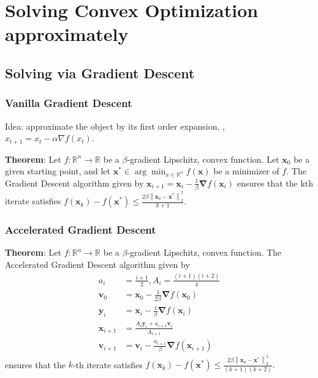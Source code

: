 \section{Solving Convex Optimization approximately}

\subsection{Solving via Gradient Descent}

\subsubsection{Vanilla Gradient Descent}

Idea: approximate the object by its first order expansion, \ie, $x_{t+1} = x_t - \alpha \nabla f(x_t)$.

\textbf{Theorem}: Let $f: \mathbb{R}^{n} \rightarrow \mathbb{R}$ be a $\beta$-gradient Lipschitz, convex function. Let $\boldsymbol{x}_{0}$ be a given starting point, and let $\boldsymbol{x}^{*} \in \arg \min _{x \in \mathbb{R}^{n}} f(\boldsymbol{x})$ be a minimizer of $f$. The Gradient Descent algorithm given by
$
\boldsymbol{x}_{i+1}=\boldsymbol{x}_{i}-\frac{1}{\beta} \boldsymbol{\nabla} f\left(\boldsymbol{x}_{i}\right)
$
ensures that the kth iterate satisfies
$
f\left(\boldsymbol{x}_{k}\right)-f\left(\boldsymbol{x}^{*}\right) \leq \frac{2 \beta\left\|\boldsymbol{x}_{0}-\boldsymbol{x}^{*}\right\|_{2}^{2}}{k+1} .
$

\subsubsection{Accelerated Gradient Descent}
\textbf{Theorem}: Let $f: \mathbb{R}^{n} \rightarrow \mathbb{R}$ be a $\beta$-gradient Lipschitz, convex function. 
The Accelerated Gradient Descent algorithm given by
$$
\begin{aligned}
a_{i} &=\frac{i+1}{2}, A_{i}=\frac{(i+1)(i+2)}{4} \\
\boldsymbol{v}_{0} &=\boldsymbol{x}_{0}-\frac{1}{2 \beta} \boldsymbol{\nabla} f\left(\boldsymbol{x}_{0}\right) \\
\boldsymbol{y}_{i} &=\boldsymbol{x}_{i}-\frac{1}{\beta} \boldsymbol{\nabla} f\left(\boldsymbol{x}_{i}\right) \\
\boldsymbol{x}_{i+1} &=\frac{A_{i} \boldsymbol{y}_{i}+a_{i+1} \boldsymbol{v}_{i}}{A_{i+1}} \\
\boldsymbol{v}_{i+1} &=\boldsymbol{v}_{i}-\frac{a_{i+1}}{\beta} \boldsymbol{\nabla} f\left(\boldsymbol{x}_{i+1}\right)
\end{aligned}
$$
ensures that the $k$-th iterate satisfies
$
f\left(\boldsymbol{x}_{k}\right)-f\left(\boldsymbol{x}^{*}\right) \leq \frac{2 \beta\left\|\boldsymbol{x}_{0}-\boldsymbol{x}^{*}\right\|_{2}^{2}}{(k+1)(k+2)} .
$


